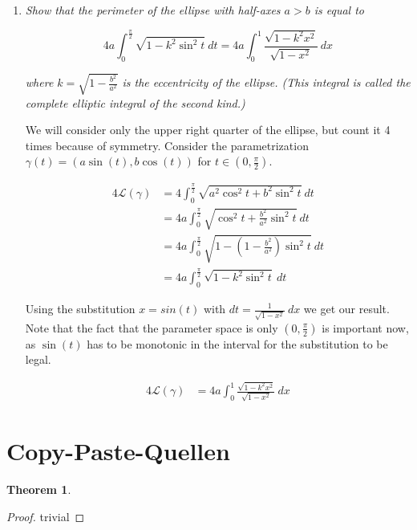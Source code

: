 \documentclass[a4paper,11pt,notitlepage,fullpage]{paper}
\theoremstyle{plain}
\newtheorem{thm}{Theorem}[section] %
\theoremstyle{definition}
\begin{document}
\begin{enumerate}
\item \emph{Show that the perimeter of the ellipse with half-axes $a>b$ is equal to }

\begin{equation*}
4a \int_0^\frac{\pi}{2} \sqrt{1 - k^2 \sin^2t} ~dt = 4a \int_0^1 \frac{\sqrt{1 - k^2 x^2}}{\sqrt{1 - x^2}} ~dx
\end{equation*}

\emph{where $k = \sqrt{1 - \frac{b^2}{a^2}}$ is the eccentricity of the ellipse. (This integral is called the complete elliptic integral of the second kind.)}

We will consider only the upper right quarter of the ellipse, but count it 4 times because of symmetry. Consider the parametrization $\gamma(t) = (a \sin(t), b \cos(t))$ for $t \in (0, \frac{\pi}{2})$.

\begin{align*}
4 \mathcal L(\gamma) &= 4 \int_0^\frac{\pi}{2} \sqrt{a^2 \cos^2t + b^2\sin^2t} ~dt \\
&= 4a \int_0^\frac{\pi}{2} \sqrt{\cos^2t + \frac{b^2}{a^2}\sin^2t} ~dt \\
&= 4a \int_0^\frac{\pi}{2} \sqrt{1 - \left(1 - \frac{b^2}{a^2}\right)\sin^2t} ~dt \\
&= 4a \int_0^\frac{\pi}{2} \sqrt{1 - k^2 \sin^2t} ~dt 
\end{align*}

Using the substitution $x = sin(t)$ with $dt = \frac{1}{\sqrt{1-x^2}} ~dx$ we get our result. Note that the fact that the parameter space is only $(0, \frac{\pi}{2})$ is important now, as $\sin(t)$ has to be monotonic in the interval for the substitution to be legal. 

\begin{align*}
4 \mathcal L(\gamma) &= 4a \int_0^1 \frac{\sqrt{1 - k^2 x^2}}{\sqrt{1 - x^2}} ~dx
\end{align*}



\end{enumerate}

\section{Copy-Paste-Quellen}



\begin{thm}

\end{thm}
\begin{proof} trivial \end{proof}
\end{document}
